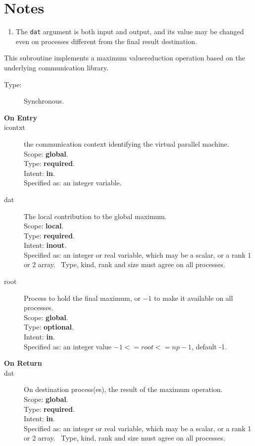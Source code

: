 \section*{Notes}
\begin{enumerate}
\item The \verb|dat| argument is both input and output, and its
  value may be changed even on processes different from the final
  result destination.
\end{enumerate}





This subroutine implements a maximum valuereduction
operation based on the underlying communication library. 
\begin{description}
\item[Type:] Synchronous.
\item[\bf  On Entry ]
\item[icontxt] the communication context identifying the virtual
  parallel machine.\\
Scope: {\bf global}.\\
Type: {\bf required}.\\
Intent: {\bf in}.\\
Specified as: an integer variable.
\item[dat] The local contribution to the global maximum.\\
Scope: {\bf local}.\\
Type: {\bf required}.\\
Intent: {\bf inout}.\\
Specified as: an integer or  real variable, which may be a
scalar, or a rank 1 or 2 array. \
Type, kind, rank and size must agree on all processes.
\item[root] Process to hold the final maximum, or $-1$ to make it available
  on all processes.\\
Scope: {\bf global}.\\
Type: {\bf optional}.\\
Intent: {\bf in}.\\
Specified as: an integer value $-1<= root <= np-1$, default -1. \\
\end{description}


\begin{description}
\item[\bf On Return]
\item[dat] On destination process(es), the result of the maximum operation.\\
Scope: {\bf global}.\\
Type: {\bf required}.\\
Intent: {\bf in}.\\
Specified as: an integer or  real variable, which may be a
scalar, or a rank 1 or 2 array. \
Type, kind, rank and size must agree on all processes.
\end{description}



